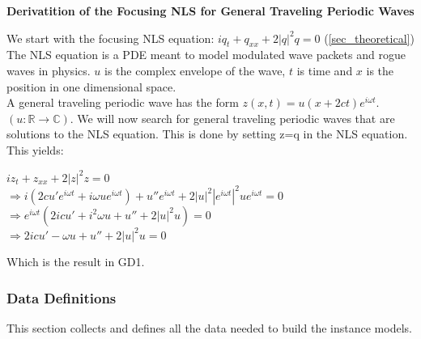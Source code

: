 \documentclass[12pt]{article}
\begin{document}
\begin{center}
	\begin{flushleft}
		\textbf{Derivatition of the Focusing NLS for 
			General Traveling Periodic 
			Waves}
	\end{flushleft} 	
\end{center} 
We start with the focusing NLS equation: $iq_{t} + q_{xx} + 
2|q|^{2}q=0$ (\ref{sec_theoretical}) \\ 

The NLS equation is a PDE meant to model modulated wave packets and rogue waves 
in physics. $u$ is the complex envelope of the wave, $t$ is time and $x$ is the 
position in one dimensional space. \\ 

A general traveling periodic wave has the form $z(x,t)=u(x+2ct)e^{i \omega 
	t}$.$(u: \mathbb{R} \rightarrow \mathbb{C})$. 
We will now search for general traveling periodic waves that are solutions to 
the NLS equation. This is done by setting z=q in the NLS equation. This 
yields: \\ 
\begin{center}
	$ iz_{t} + z_{xx} + 2|z|^{2}z = 0$ \\ 
	$ \Rightarrow i(2cu'e^{i \omega t} + i \omega ue^{i \omega t}) + u''e^{i 
	\omega 
		t} + 2|u|^{2}|e^{i \omega t}|^{2} u e^{i \omega t} = 0 $ \\
	$\Rightarrow e^{i \omega t} (2icu' + i^{2} \omega u + u'' + 2|u|^{2}u) = 0 
	$ 
	\\ 
	$ \Rightarrow 2icu' - \omega u + u'' + 2|u|^{2}u =0$ \\ 
\end{center}
Which is the result in GD1.

\subsubsection{Data Definitions}\label{sec_datadef}

This section collects and defines all the data needed to build the instance
models. 
~\newline
\end{document}
